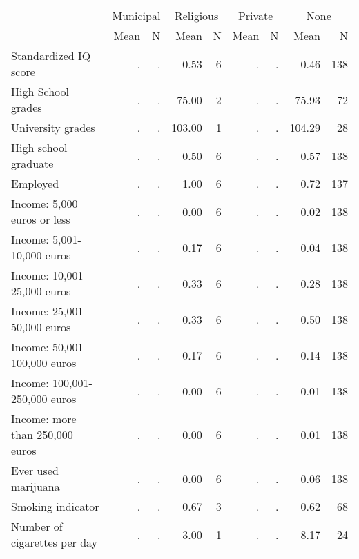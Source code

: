 \begin{tabular}{l r r r r r r r r}
\toprule
& \multicolumn{2}{c}{Municipal} & \multicolumn{2}{c}{Religious} & \multicolumn{2}{c}{Private} & \multicolumn{2}{c}{None} \\
& \scriptsize Mean & \scriptsize N & \scriptsize Mean & \scriptsize N & \scriptsize Mean & \scriptsize N & \scriptsize Mean & \scriptsize N \\
\midrule
Standardized IQ score &         . & . &      0.53 &         6 &         . & . &      0.46 &       138 \\
High School grades &         . & . &     75.00 &         2 &         . & . &     75.93 &        72 \\
University grades &         . & . &    103.00 &         1 &         . & . &    104.29 &        28 \\
High school graduate &         . & . &      0.50 &         6 &         . & . &      0.57 &       138 \\
Employed &         . & . &      1.00 &         6 &         . & . &      0.72 &       137 \\
Income: 5,000 euros or less &         . & . &      0.00 &         6 &         . & . &      0.02 &       138 \\
Income: 5,001-10,000 euros &         . & . &      0.17 &         6 &         . & . &      0.04 &       138 \\
Income: 10,001-25,000 euros &         . & . &      0.33 &         6 &         . & . &      0.28 &       138 \\
Income: 25,001-50,000 euros &         . & . &      0.33 &         6 &         . & . &      0.50 &       138 \\
Income: 50,001-100,000 euros &         . & . &      0.17 &         6 &         . & . &      0.14 &       138 \\
Income: 100,001-250,000 euros &         . & . &      0.00 &         6 &         . & . &      0.01 &       138 \\
Income: more than 250,000 euros &         . & . &      0.00 &         6 &         . & . &      0.01 &       138 \\
Ever used marijuana &         . & . &      0.00 &         6 &         . & . &      0.06 &       138 \\
Smoking indicator &         . & . &      0.67 &         3 &         . & . &      0.62 &        68 \\
Number of cigarettes per day &         . & . &      3.00 &         1 &         . & . &      8.17 &        24 \\

\end{tabular}
